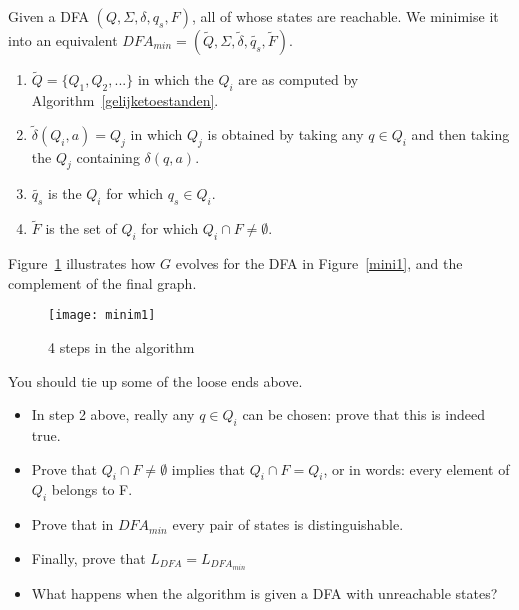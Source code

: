 \begin{code}
Given a DFA $(Q,\Sigma,\delta,q_s,F)$, all of whose states are reachable. We minimise it into an equivalent $DFA_{min}=(\tilde{Q},\Sigma,\tilde{\delta},\tilde{q_s},\tilde{F})$.
\begin{enumerate}
\item $\tilde{Q} = \{Q_1, Q_2, ...\}$ in which the $Q_i$ are as computed by Algorithm~\ref{gelijketoestanden}.

\item $\tilde{\delta}(Q_i,a) = Q_j$ in which $Q_j$ is obtained by taking any
  $q \in Q_i$ and then taking the $Q_j$ containing $\delta(q,a)$.

\item $\tilde{q_s}$ is the $Q_i$ for which $q_s \in Q_i$.

\item $\tilde{F}$ is the set of $Q_i$ for which $Q_i \cap F \neq \emptyset$.

\end{enumerate}
\end{code}

Figure~\ref{minim1} illustrates how $G$ evolves for the DFA in
Figure~\ref{mini1}, and the complement of the final graph.
\begin{figure}[h]
\begin{center}\texttt{[image: minim1]}\end{center}
\caption{ 4 steps in the algorithm\label{minim1}}
\end{figure}

\begin{exercise}
You should tie up some of the loose ends above.
\begin{itemize}
\item In step 2 above, really any $q \in Q_i$ can be chosen: prove that this is
indeed true.

\item Prove that $Q_i \cap F \neq \emptyset$ implies that $Q_i \cap F =
Q_i$, or in words: every element of $Q_i$ belongs to F.

\item Prove that in $DFA_{min}$ every pair of states is distinguishable.

\item Finally, prove that $L_{DFA} = L_{DFA_{min}}$

\item What happens when the algorithm is given a DFA with unreachable states?
\end{itemize}
\end{exercise}

